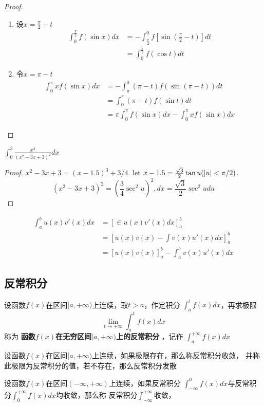 \documentclass[11pt]{article}
\begin{document}
\begin{proof}
\begin{enumerate}
\item 设\(x=\frac{\pi}{2}-t\)
\begin{align*}
\int_0^{\frac{\pi}{2}}f(\sin x)dx&=-\int_{\frac{\pi}{2}}^0f[\sin(\frac{\pi}{2}-t)]dt\\
&=\int_0^{\frac{\pi}{2}}f(\cos t)dt
\end{align*}
\item 令\(x=\pi-t\)
\begin{align*}
\int_0^\pi xf(\sin x)dx&=-\int_\pi^0(\pi-t)f(\sin(\pi-t))dt\\
&=\int_0^\pi(\pi-t)f(\sin t)dt\\
&=\pi\int_0^\pi f(\sin x)dx-\int_0^\pi xf(\sin x)dx
\end{align*}
\end{enumerate}
\end{proof}

\begin{proposition}[]
\(\int_0^3\frac{x^2}{(x^2-3x+3)^2}dx\)
\end{proposition}

\begin{proof}
\(x^2-3x+3=(x-1.5)^3+3/4\). let \(x-1.5=\frac{\sqrt{3}}{2}\tan
   u(\abs{u}<\pi/2)\).
\begin{equation*}
(x^2-3x+3)^2=(\frac{3}{4}\sec^2u)^2,dx=\frac{\sqrt{3}}{2}\sec^2udu
\end{equation*}
\end{proof}

\begin{align*}
\int_a^bu(x)v'(x)dx&=\left[\in u(x)v'(x)dx
\right]^b_a\\
&=\left[u(x)v(x)-\int v(x)u'(x)dx\right]_a^b\\
&=[u(x)v(x)]^b_a-\int^b_av(x)u'(x)dx
\end{align*}
\subsection{反常积分}
\label{sec:org5aa2dfd}
设函数\(f(x)\)在区间\([a,+\infty)\)上连续，取\(t>a\)，作定积分
\(\int_a^tf(x)dx\)，再求极限
\begin{equation*}
\lim_{t\to+\infty}\int^t_af(x)dx
\end{equation*}
称为 \textbf{函数\(f(x)\)在无穷区间\([a,+\infty)\)上的反常积分} ，记作
\(\int_a^{+\infty}f(x)dx\)

\begin{definition}[]
设函数\(f(x)\)在区间\([a,+\infty)\)上连续，如果极限存在，那么称反常积分收敛，
并称此极限为反常积分的值，若不存在，那么反常积分发散

设函数\(f(x)\)在区间\((-\infty,+\infty)\)上连续，如果反常积分
\(\int_{-\infty}^0f(x)dx\)与反常积分\(\int_0^{+\infty}f(x)dx\)均收敛，那么称
反常积分\(\int_{-\infty}^{+\infty}\)收敛，
\end{definition}
\end{document}
